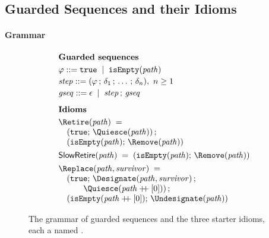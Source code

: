 \subsection{Guarded Sequences and their Idioms}\label{sec:idioms}

\paragraph{Grammar}

\begin{figure}[t]
\centering
\[
\begin{array}{@{}l@{}}
\textbf{Guarded sequences}\\[3pt]
\varphi \mathrel{::=} \mathtt{true} \;\mid\; \mathtt{isEmpty}(\mathit{path})\\[2pt]
\mathit{step} \mathrel{::=} (\varphi\,;\, \delta_1\,;\, \ldots\,;\, \delta_n),\ n \geq 1\\[2pt]
\mathit{gseq} \mathrel{::=} \epsilon \;\mid\; \mathit{step}\,;\, \mathit{gseq}\\[8pt]
\textbf{Idioms}\\[3pt]
\Retire(\mathit{path}) \;=\;\\
\quad (\mathtt{true};\, \Quiesce(\mathit{path}))\,;\\
\quad (\mathtt{isEmpty}(\mathit{path});\, \Remove(\mathit{path}))\\[4pt]
\SlowRetire(\mathit{path}) \;=\; (\mathtt{isEmpty}(\mathit{path});\, \Remove(\mathit{path}))\\[4pt]
\Replace(\mathit{path}, \mathit{survivor}) \;=\;\\
\quad (\mathtt{true};\, \Designate(\mathit{path}, \mathit{survivor})\,;\\
\quad\qquad \Quiesce(\mathit{path} \mathbin{+\!\!+} [0]))\,;\\
\quad (\mathtt{isEmpty}(\mathit{path} \mathbin{+\!\!+} [0]);\, \Undesignate(\mathit{path}))
\end{array}
\]
\caption{The grammar of guarded sequences and the three starter idioms, each a named \gseq.}
\label{fig:gseq-idioms}
\end{figure}

